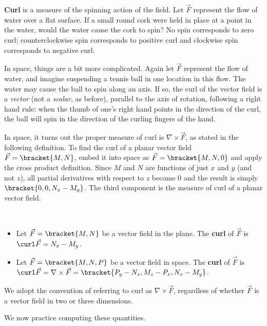 \textbf{Curl} is a measure of the spinning action of the field. Let $\vec F$ represent the flow of water over a flat surface. If a small round cork were held in place at a point in the water, would the water cause the cork to spin? No spin corresponds to zero curl; counterclockwise spin corresponds to positive curl and clockwise spin corresponds to negative curl. 

In space, things are a bit more complicated. Again let $\vec F$ represent the flow of water, and imagine suspending a tennis ball in one location in this flow. The water may cause the ball to spin along an axis. If so, the curl of the vector field is a \emph{vector} (not a \emph{scalar}, as before), parallel to the axis of rotation, following a right hand rule: when the thumb of one's right hand points in the direction of the curl, the ball will spin in the direction of the curling fingers of the hand.

In space, it turns out the proper measure of curl is $\nabla \times \vec F$, as stated in the following definition. To find the curl of a planar vector field $\vec F =\bracket{M,N}$, embed it into space as $\vec F =\bracket{M, N, 0}$ and apply the cross product definition. Since $M$ and $N$ are functions of just $x$ and $y$ (and not $z$), all partial derivatives with respect to $z$ become 0 and the result is simply $\bracket{0,0,N_x-M_y}$. The third component is the measure of curl of a planar vector field. 

\begin{definition}\label{def:curl}
\mbox{}\\[-2\baselineskip]\parbox[t]{\linewidth}{\begin{itemize}
	\item Let $\vec F =\bracket{M,N}$ be a vector field in the plane. The \textbf{curl} of $\vec F$ is $\curl \vec F = N_x - M_y$.
	\item Let $\vec F =\bracket{M,N,P}$ be a vector field in space. The \textbf{curl} of $\vec F$ is $\curl \vec F = \nabla \times \vec F =\bracket{P_y-N_z,M_z-P_x,N_x - M_y}$.
\end{itemize}}
\end{definition}

We adopt the convention of referring to curl as $\nabla \times \vec F$, regardless of whether $\vec F$ is a vector field in two or three dimensions. 

We now practice computing these quantities.

